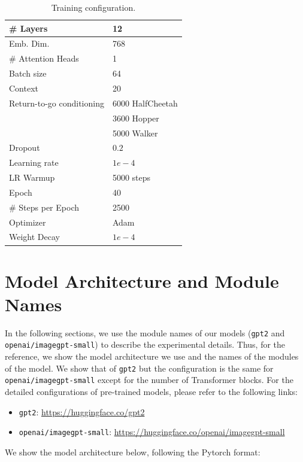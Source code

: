 \documentclass{article}
\begin{document}
\begin{table}[H]
\caption{Training configuration.}
\label{table:training-configuration}
\centering
\begin{tabular}{ll}
\toprule
\cmidrule(r){1-2}
\# Layers & 12 \\
\midrule
Emb. Dim. & 768 \\
\midrule
\# Attention Heads & 1 \\
\midrule
Batch size & 64 \\
\midrule
Context & 20 \\
\midrule
Return-to-go conditioning & 6000 HalfCheetah \\
& 3600 Hopper \\
& 5000 Walker \\
\midrule
Dropout & $0.2$ \\
\midrule
Learning rate & $1e-4$ \\
\midrule
LR Warmup & 5000 steps \\
\midrule
Epoch & 40 \\
\midrule
\# Steps per Epoch & 2500 \\
\midrule
Optimizer & Adam \\
\midrule
Weight Decay & $1e-4$ \\
\bottomrule
\end{tabular}
\end{table}

\section{Model Architecture and Module Names}
In the following sections, we use the module names of our models (\lstinline{gpt2} and \lstinline{openai/imagegpt-small}) to describe the experimental details. Thus, for the reference, we show the model architecture we use and the names of the modules of the model. We show that of \lstinline{gpt2} but the configuration is the same for \lstinline{openai/imagegpt-small} except for the number of Transformer blocks. For the detailed configurations of pre-trained models, please refer to the following links:
\begin{itemize}
    \item \lstinline{gpt2}: \href{https://huggingface.co/gpt2}{https://huggingface.co/gpt2}
    \item \lstinline{openai/imagegpt-small}: \href{https://huggingface.co/openai/imagegpt-small}{https://huggingface.co/openai/imagegpt-small}
\end{itemize}
We show the model architecture below, following the Pytorch format:  
\end{document}
